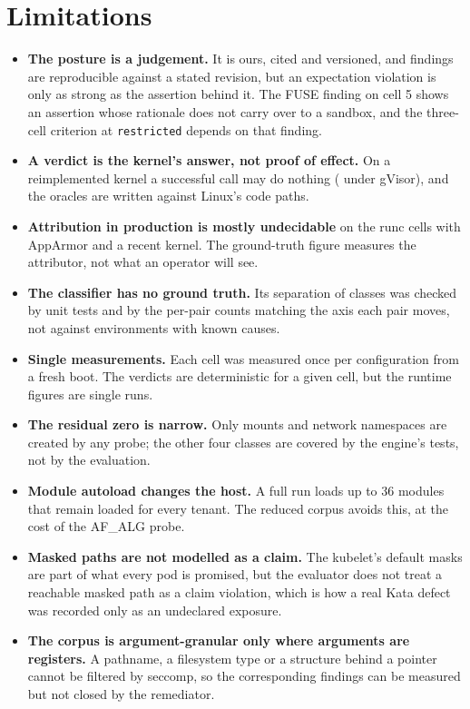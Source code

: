 \section{Limitations}
\label{sec:limits}

\begin{itemize}[leftmargin=*]
\item \textbf{The posture is a judgement.} It is ours, cited and versioned, and findings are reproducible against a stated revision, but an expectation violation is only as strong as the assertion behind it. The FUSE finding on cell 5 shows an assertion whose rationale does not carry over to a sandbox, and the three-cell criterion at \texttt{restricted} depends on that finding.
\item \textbf{A verdict is the kernel's answer, not proof of effect.} On a reimplemented kernel a successful call may do nothing ( under gVisor), and the oracles are written against Linux's code paths.
\item \textbf{Attribution in production is mostly undecidable} on the runc cells with AppArmor and a recent kernel. The ground-truth figure measures the attributor, not what an operator will see.
\item \textbf{The classifier has no ground truth.} Its separation of classes was checked by unit tests and by the per-pair counts matching the axis each pair moves, not against environments with known causes.
\item \textbf{Single measurements.} Each cell was measured once per configuration from a fresh boot. The verdicts are deterministic for a given cell, but the runtime figures are single runs.
\item \textbf{The residual zero is narrow.} Only mounts and network namespaces are created by any probe; the other four classes are covered by the engine's tests, not by the evaluation.
\item \textbf{Module autoload changes the host.} A full run loads up to 36 modules that remain loaded for every tenant. The reduced corpus avoids this, at the cost of the AF\_ALG probe.
\item \textbf{Masked paths are not modelled as a claim.} The kubelet's default masks are part of what every pod is promised, but the evaluator does not treat a reachable masked path as a claim violation, which is how a real Kata defect was recorded only as an undeclared exposure.
\item \textbf{The corpus is argument-granular only where arguments are registers.} A pathname, a filesystem type or a structure behind a pointer cannot be filtered by seccomp, so the corresponding findings can be measured but not closed by the remediator.
\end{itemize}

